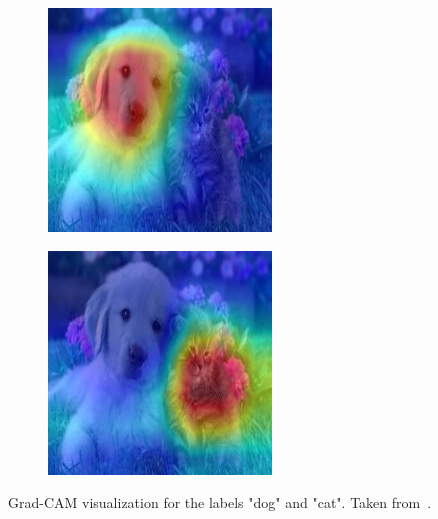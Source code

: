 \begin{figure}[htb]
\begin{subfigure}{0.2\linewidth}
        \includegraphics[width=\linewidth]{resources/related_works/gradcam_dog.jpg}
    \end{subfigure}
    \begin{subfigure}{0.2\linewidth}
        \includegraphics[width=\linewidth]{resources/related_works/gradcam_cat.jpg}
    \end{subfigure}
    \caption[Grad-Cam Visualization]{Grad-CAM visualization for the labels "dog" and "cat". Taken from~\textcite{GradCamExample}.}
    \label{fig:grad_cam}
\end{figure}
